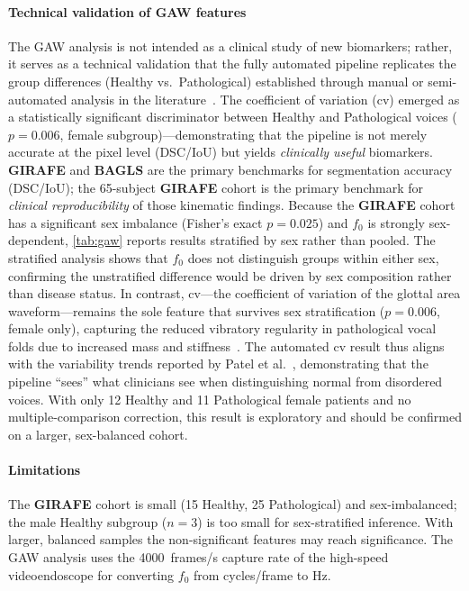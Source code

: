 \documentclass[preprint,12pt]{elsarticle}
\newcommand{\girafe}{\textbf{GIRAFE}}
\newcommand{\bagls}{\textbf{BAGLS}}
\newcommand{\gaw}{GAW}
\begin{document}
\paragraph{Technical validation of \gaw{} features}
The \gaw{} analysis is not intended as a clinical study of new biomarkers;
rather, it serves as a technical validation that the fully automated
pipeline replicates the group differences (Healthy vs.\ Pathological)
established through manual or semi-automated analysis in the
literature~\cite{patel2015kinematic,patel2016nodules,little2007glottal}.
The coefficient of variation (cv) emerged as a statistically significant
discriminator between Healthy and Pathological voices ($p{=}0.006$, female
subgroup)---demonstrating that the pipeline is not merely accurate at the
pixel level (DSC\slash IoU) but yields \emph{clinically useful} biomarkers.
\girafe{} and \bagls{} are the primary benchmarks for segmentation
accuracy (DSC\slash IoU); the \num{65}-subject \girafe{} cohort is the
primary benchmark for \emph{clinical reproducibility} of those
kinematic findings.
Because the \girafe{} cohort has a significant sex imbalance (Fisher's
exact $p{=}0.025$) and $f_0$ is strongly sex-dependent,
\cref{tab:gaw} reports results stratified by sex rather than pooled.
The stratified analysis shows that $f_0$ does not distinguish groups
within either sex, confirming the unstratified difference would be
driven by sex composition rather than disease status.
In contrast, cv---the coefficient of variation of the glottal area
waveform---remains the sole feature that survives sex stratification
($p{=}0.006$, female only), capturing the reduced vibratory regularity in
pathological vocal folds due to increased mass and
stiffness~\cite{patel2016nodules}.
The automated cv result thus aligns with the variability trends reported
by Patel et al.~\cite{patel2015kinematic}, demonstrating that the
pipeline ``sees'' what clinicians see when distinguishing normal from
disordered voices.
With only \num{12} Healthy and \num{11} Pathological female patients and no
multiple-comparison correction, this result is exploratory and should be
confirmed on a larger, sex-balanced cohort.

\paragraph{Limitations}
The \girafe{} cohort is small (\num{15} Healthy, \num{25} Pathological)
and sex-imbalanced; the male Healthy subgroup ($n{=}3$) is too small for
sex-stratified inference.
With larger, balanced samples the non-significant features may reach
significance.
The \gaw{} analysis uses the \SI{4000}{frames/s} capture rate of the
high-speed videoendoscope for converting $f_0$ from cycles\slash frame to Hz.
\end{document}
